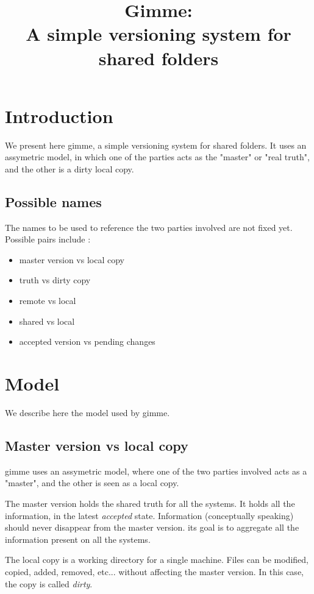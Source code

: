 \documentclass[10pt,a4paper]{article}
\title{Gimme:\\ A simple versioning system for shared folders}
\newcommand{\gimme}{\textsf{gimme}}
\begin{document}
\maketitle

\section{Introduction}

We present here \gimme, a simple versioning system for shared folders. It uses an assymetric model, in which one of the parties acts as the "master" or "real truth", and the other is a dirty local copy.

\subsection{Possible names}

The names to be used to reference the two parties involved are not fixed yet. Possible pairs include :
\begin{itemize}
\item master version vs local copy
\item truth vs dirty copy
\item remote vs local
\item shared vs local
\item accepted version vs pending changes
\end{itemize}

\section{Model}

We describe here the model used by \gimme{}.

\subsection{Master version vs local copy}

\gimme{} uses an assymetric model, where one of the two parties involved acts as a "master", and the other is seen as a local copy.

The master version holds the shared truth for all the systems. It holds all the information, in the latest \textit{accepted} state. Information (conceptually speaking) should never disappear from the master version. its goal is to aggregate all the information present on all the systems.

The local copy is a working directory for a single machine. Files can be modified, copied, added, removed, etc... without affecting the master version. In this case, the copy is called \textit{dirty}.
\end{document}
